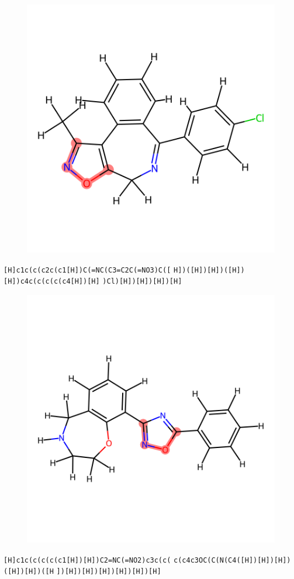 \documentclass{article}
\begin{document}
\begin{figure}[ht]
\centering
    \includegraphics{mol178.png}
\end{figure}
\verb|[H]c1c(c(c2c(c1[H])C(=NC(C3=C2C(=NO3)C([| \verb|H])([H])[H])([H])[H])c4c(c(c(c(c4[H])[H]| \verb|)Cl)[H])[H])[H])[H]|

\begin{figure}[ht]
\centering
    \includegraphics{mol179.png}
\end{figure}
\verb|[H]c1c(c(c(c(c1[H])[H])C2=NC(=NO2)c3c(c(| \verb|c(c4c3OC(C(N(C4([H])[H])[H])([H])[H])([H| \verb|])[H])[H])[H])[H])[H])[H]|
\end{document}
